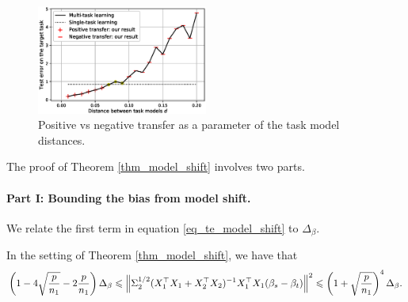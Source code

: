 \begin{figure}
	\centering
	\includegraphics[width=0.5\textwidth]{figures/model_shift_phase_transition.eps}
	\caption{Positive vs negative transfer as a parameter of the task model distances.}
	\label{fig_model_shift_phasetrans}
\end{figure}

\begin{example}
\end{example}

\medskip
The proof of Theorem \ref{thm_model_shift} involves two parts.

\paragraph{Part I: Bounding the bias from model shift.}
We relate the first term in equation \eqref{eq_te_model_shift} to $\Delta_{\beta}$.
\begin{proposition}\label{prop_model_shift}
	In the setting of Theorem \ref{thm_model_shift}, we have that
	\begin{align*}
		\left({1 - {4\sqrt{\frac{p}{n_1}}} - {2\frac{p}{n_1}}}\right) \Delta_{\beta}
		\leqslant \left\| \Sigma_2^{1/2} (X_1^{\top}X_1 + X_2^{\top}X_2)^{-1}X_1^{\top}X_1(\beta_s - \beta_t) \right\|^2
		\leqslant \left({1 + \sqrt{\frac{p}{n_1}}}\right)^4 \Delta_{\beta}.
	\end{align*}
\end{proposition}

